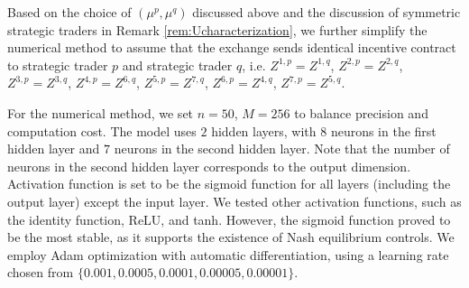 \documentclass[12pt]{article}
\begin{document}
Based on the choice of $(\mu^p, \mu^q)$ discussed above and the discussion of symmetric strategic traders in Remark \ref{rem:Ucharacterization}, we further simplify the numerical method to assume that the exchange sends identical incentive contract to strategic trader $p$ and strategic trader $q$, i.e. $Z^{1,p} = Z^{1,q}$, $Z^{2,p} = Z^{2,q}$, $Z^{3,p} = Z^{3,q}$, $Z^{4,p} = Z^{6,q}$, $Z^{5,p} = Z^{7,q}$, $Z^{6,p} = Z^{4,q}$, $Z^{7,p} = Z^{5,q}$. \vspace{0.5em}

For the numerical method, we set $n =50$, $M = 256$ to balance precision and computation cost. The model uses $2$ hidden layers, with $8$ neurons in the first hidden layer and $7$ neurons in the second hidden layer. Note that the number of neurons in the second hidden layer corresponds to the output dimension. Activation function is set to be the sigmoid function for all layers (including the output layer) except the input layer. We tested other activation functions, such as the identity function, ReLU, and tanh. However, the sigmoid function proved to be the most stable, as it supports the existence of Nash equilibrium controls. We employ Adam optimization with automatic differentiation, using a learning rate chosen from $\{0.001,0.0005,0.0001,0.00005,0.00001\}$. \vspace{0.5em}






\end{document}
